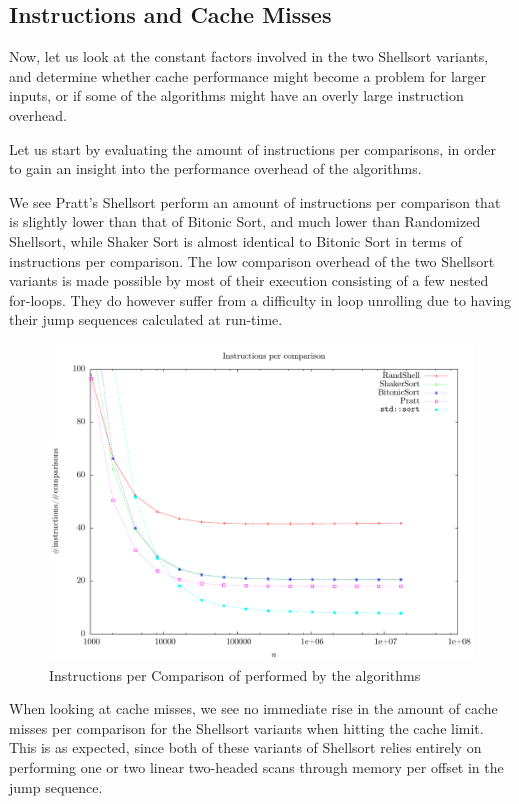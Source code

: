 \subsection{Instructions and Cache Misses}

Now, let us look at the constant factors involved in the two Shellsort variants, and determine whether cache performance might become a problem for larger inputs, or if some of the algorithms might have an overly large instruction overhead.

Let us start by evaluating the amount of instructions per comparisons, in order to gain an insight into the performance overhead of the algorithms.

We see Pratt's Shellsort perform an amount of instructions per comparison that is slightly lower than that of Bitonic Sort, and much lower than Randomized Shellsort, while Shaker Sort is almost identical to Bitonic Sort in terms of instructions per comparison.
The low comparison overhead of the two Shellsort variants is made possible by most of their execution consisting of a few nested for-loops. 
They do however suffer from a difficulty in loop unrolling due to having their jump sequences calculated at run-time. 

\begin{figure}
\center
\includegraphics[width=\textwidth]{graphs/Shellsorts/instructionscomparison.pdf}
\caption{Instructions per Comparison of performed by the algorithms}
\label{fig:Shellsorts:instructions:comparisons}
\end{figure}

When looking at cache misses, we see no immediate rise in the amount of cache misses per comparison for the Shellsort variants when hitting the cache limit. This is as expected, since both of these variants of Shellsort relies entirely on performing one or two linear two-headed scans through memory per offset in the jump sequence.

